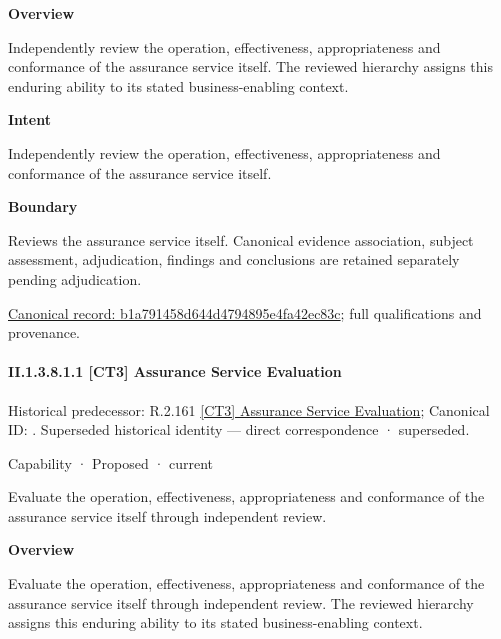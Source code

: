 \textbf{Overview}



Independently review the operation, effectiveness, appropriateness and conformance of the assurance service itself. The reviewed hierarchy assigns this enduring ability to its stated business-enabling context.



\textbf{Intent}



Independently review the operation, effectiveness, appropriateness and conformance of the assurance service itself.



\textbf{Boundary}



Reviews the assurance service itself. Canonical evidence association, subject assessment, adjudication, findings and conclusions are retained separately pending adjudication.


{\footnotesize \href{../../../../continuum/strategy/capability/b1a791458d644d4794895e4fa42ec83c.md}{Canonical record: b1a791458d644d4794895e4fa42ec83c}; full qualifications and provenance.}\par
\paragraph*{II.1.3.8.1.1 [CT3] Assurance Service Evaluation}
\label{navigation:II.1.3.8.1.1}

{\small Historical predecessor: R.2.161 \hyperref[element:be34b54314c6444f8418d645f6c83b6d]{[CT3] Assurance Service Evaluation}; Canonical ID: \texttt{}. Superseded historical identity — direct correspondence · superseded.}\par
\label{element:039343518db542d48cde6afab84a3e1e}
{\small Capability · Proposed · current}\par

Evaluate the operation, effectiveness, appropriateness and conformance of the assurance service itself through independent review.



\textbf{Overview}



Evaluate the operation, effectiveness, appropriateness and conformance of the assurance service itself through independent review. The reviewed hierarchy assigns this enduring ability to its stated business-enabling context.




